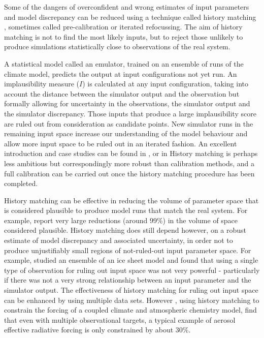 \documentclass[gmd, manuscript]{copernicus}
\begin{document}
Some of the dangers of overconfident and wrong estimates of input parameters and model discrepancy can be reduced using a technique called history matching \citep{craig1996strategies}, sometimes called pre-calibration or iterated refocussing. The aim of history matching is not to find the most likely inputs, but to reject those unlikely to produce simulations statistically close to observations of the real system. 

A statistical model called an emulator, trained on an ensemble of runs of the climate model, predicts the output at input configurations not yet run. An implausibility measure ($I$) is calculated at any input configuration, taking into account the distance between the simulator output and the observation but formally allowing for uncertainty in the observations, the simulator output and the simulator discrepancy. Those inputs that produce a large implausibility score are ruled out from consideration as candidate points. New simulator runs in the remaining input space increase our understanding of the model behaviour and allow more input space to be ruled out in an iterated fashion. An excellent introduction and case studies can be found in \cite{andrianakis2015bayesian}, or in \cite{vernon2010galaxy} History matching is perhaps less ambitious but correspondingly more robust than calibration methods, and a full calibration can be carried out once the history matching procedure has been completed.

History matching can be effective in reducing the volume of parameter space that is considered plausible to produce model runs that match the real system. For example, \cite{williamson2015identifying} report very large reductions (around 99\%) in the volume of space considered plausible. History matching does still depend however, on a robust estimate of model discrepancy and associated uncertainty, in order not to produce unjustifiably small regions of not-ruled-out input parameter space. For example, \citep{mcneall2013potential} studied an ensemble of an ice sheet model and found that using a single type of observation for ruling out input space was not very powerful - particularly if there was not a very strong relationship between an input parameter and the simulator output. The effectiveness of history matching for ruling out input space can be enhanced by using multiple data sets. However \citep{johnson2018importance}, using history matching to constrain the forcing of a coupled climate and atmospheric chemistry model, find that even with multiple observational targets, a typical example of aerosol effective radiative forcing is only constrained by about 30\%.
\end{document}
